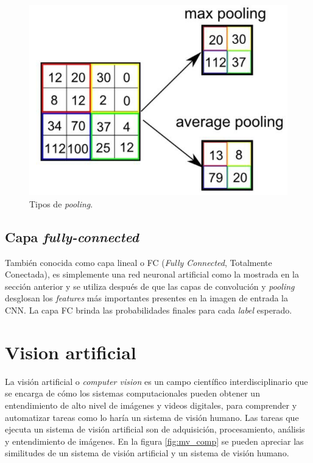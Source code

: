 \begin{figure}[h]
	\centering
	\includegraphics[scale=0.3]{./Figures/cnn_pool.png}
	\caption{Tipos de \textit{pooling}\protect\footnotemark.}
	\label{fig:cnn_pool}
\end{figure}

\subsection{Capa \textit{fully-connected}}
También conocida como capa lineal o FC (\textit{Fully Connected}, Totalmente Conectada), es simplemente una red neuronal artificial como la
mostrada en la sección anterior y se utiliza después de que las capas de convolución y \textit{pooling} desglosan los \textit{features} más importantes presentes en la imagen de entrada  la CNN. La capa FC brinda las probabilidades finales para cada \textit{label} esperado.

\section{Vision artificial}
La visión artificial o \textit{computer vision} es un campo científico interdisciplinario que se encarga de cómo los sistemas computacionales pueden obtener un entendimiento de alto nivel de imágenes y videos digitales, para comprender y automatizar tareas como lo haría un sistema de visión humano. Las tareas que ejecuta un sistema de visión artificial son de adquisición, procesamiento, análisis y entendimiento de imágenes. En la figura \ref{fig:mv_comp} se pueden apreciar las similitudes de un sistema de visión artificial y un sistema de visión humano.

